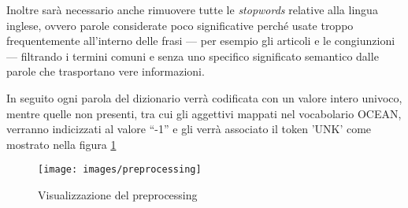 Inoltre sarà necessario anche rimuovere tutte le \emph{stopwords} relative alla lingua inglese, ovvero parole considerate poco significative perché usate troppo frequentemente all'interno delle frasi --- per esempio gli articoli e le congiunzioni --- filtrando i termini comuni e senza uno specifico significato semantico dalle parole che trasportano vere informazioni.

In seguito ogni parola del dizionario verrà codificata con un valore intero univoco, mentre quelle non presenti, tra cui gli aggettivi mappati nel vocabolario OCEAN, verranno indicizzati al valore ``-1'' e gli verrà associato il token 'UNK' come mostrato nella figura \ref{fig:preprocessing}
\begin{figure}[H]
	\centering
	{\texttt{[image: images/preprocessing]}}
	\caption{Visualizzazione del preprocessing}
	\label{fig:preprocessing}
\end{figure}


